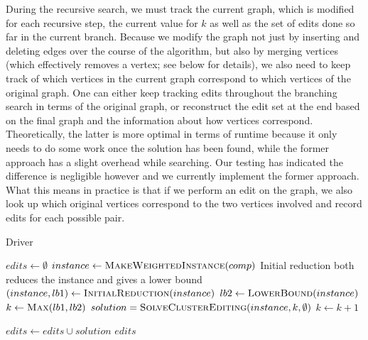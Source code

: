 \documentclass[12pt,oneside,english,parskip=full,headings=small]{scrbook}
\theoremstyle{definition}
\begin{document}
During the recursive search, we must track the current graph, which is modified for each recursive
step, the current value for $k$ as well as the set of edits done so far in the current branch.
Because we modify the graph not just by inserting and deleting edges over the course of the
algorithm, but also by merging vertices (which effectively removes a vertex; see below for details),
we also need to keep track of which vertices in the current graph correspond to which vertices of
the original graph. One can either keep tracking edits throughout the branching search in terms of
the original graph, or reconstruct the edit set at the end based on the final graph and the
information about how vertices correspond. Theoretically, the latter is more optimal in terms of
runtime because it only needs to do some work once the solution has been found, while the former
approach has a slight overhead while searching. Our testing has indicated the difference is
negligible however and we currently implement the former approach. What this means in practice is
that if we perform an edit on the graph, we also look up which original vertices correspond to the
two vertices involved and record edits for each possible pair.

\begin{algorithm}[h]
\caption{Driver}
\label{alg:driver}
\begin{algorithmic}

	\State $edits \gets \emptyset$
		\State $instance \gets \Call{MakeWeightedInstance}{comp}$
		\LineComment Initial reduction both reduces the instance and gives a lower bound
		\State $(instance, lb1) \gets \Call{InitialReduction}{instance}$
		\State $lb2 \gets \Call{LowerBound}{instance}$
		\State $k \gets \Call{Max}{lb1, lb2}$
		\Repeat
			\State $solution = \Call{SolveClusterEditing}{instance, k, \emptyset}$
			\State $k \gets k + 1$

		\State $edits \gets edits \cup solution$
	\EndFor
	\State \Return $edits$
\EndFunction

\end{algorithmic}
\end{algorithm}
\end{document}
